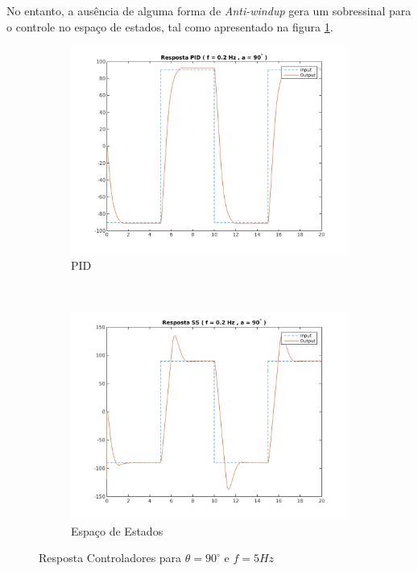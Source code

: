 \documentclass[a4paper,11pt]{article}
\begin{document}
No entanto, a ausência de alguma forma de \textit{Anti-windup} gera um sobressinal para o controle no espaço de estados, tal como apresentado na figura \ref{fig:control_s90dt5}.

\begin{figure}[H]
    \centering
    \begin{subfigure}[b]{0.5\textwidth}
        \centering
        \includegraphics[width = \linewidth]{tex/img/quanserpid_s90num5.png}
        \caption{PID}
    \end{subfigure}%
    ~ 
    \begin{subfigure}[b]{0.5\textwidth}
        \centering
        \includegraphics[width = \linewidth]{tex/img/quanserss_s90num5.png}
        \caption{Espaço de Estados}
    \end{subfigure}%
    \caption{Resposta Controladores para $\theta=90^\circ$ e $f = 5Hz$}
    \label{fig:control_s90dt5}
\end{figure}
\end{document}

